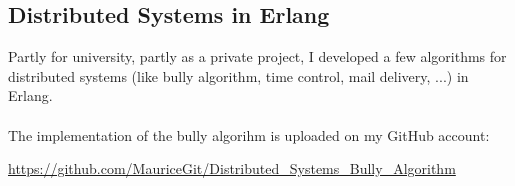 \documentclass[a4paper, 12pt]{article}
\begin{document}
\subsection{Distributed Systems in Erlang}
 
Partly for university, partly as a private project, I developed a few algorithms for distributed systems (like 
bully algorithm, time control, mail delivery, ...) in Erlang.
\\
\\
The implementation of the bully algorihm is uploaded on my GitHub account:
\begin{center}
	\url{https://github.com/MauriceGit/Distributed_Systems_Bully_Algorithm}
\end{center}

 
\end{document}
